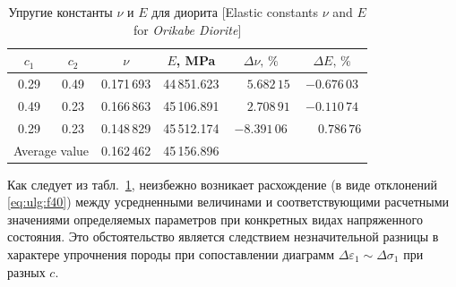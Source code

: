 \begin{table}[b!]

\small \centering

\caption{Упругие константы $\nu$ и $E$  для диорита [Elastic constants $\nu$ and $E$ for {\it Orikabe Diorite}\/] \label{un:tabl2}}

\vspace{-5mm}

\renewcommand{\tabcolsep}{0.53cm}

\begin{tabular}{c|c|c|c|c|c}

\hline

\rule{0mm}{11pt}%

\footnotesize $c_{1}$ & \footnotesize  $c_{2}$ & \footnotesize  $\nu$ & \footnotesize  $E$, MPa & \footnotesize  $\Delta\nu, \, \% $ & \footnotesize  $\Delta{E},\, \%$ \\

            \hline

\rule{0mm}{12pt}%

            \phantom{1}0.29 & 0.49 & 0.171\,693 & 44\,851.623 & $\phantom{-}5.682\,15$ & $-0.676\,03$ \\

             \phantom{1}0.49 & 0.23 & 0.166\,863 & 45\,106.891 & $\phantom{-}2.708\,91$ & $-0.110\,74$ \\

             \phantom{1}0.29 & 0.23 & 0.148\,829 & 45\,512.174 & $-8.391\,06$ & $\phantom{-}0.786\,76$ \\

  \hline

 \multicolumn {2}{l|}{Average value}  &\rule{0mm}{12pt}%

0.162\,462 & 45\,156.896 \\

            \hline

        \end{tabular}



\end{table} 



Как следует из табл.~\ref{un:tabl2}, неизбежно возникает расхождение (в виде отклонений \eqref{eq:ulg:f40}) между усредненными величинами и соответствующими расчетными значениями определяемых параметров при конкретных видах напряженного состояния. Это обстоятельство является следствием незначительной разницы в характере упрочнения породы при сопоставлении диаграмм $\Delta\varepsilon_1\sim \Delta\sigma_1$ при разных $c$. 

